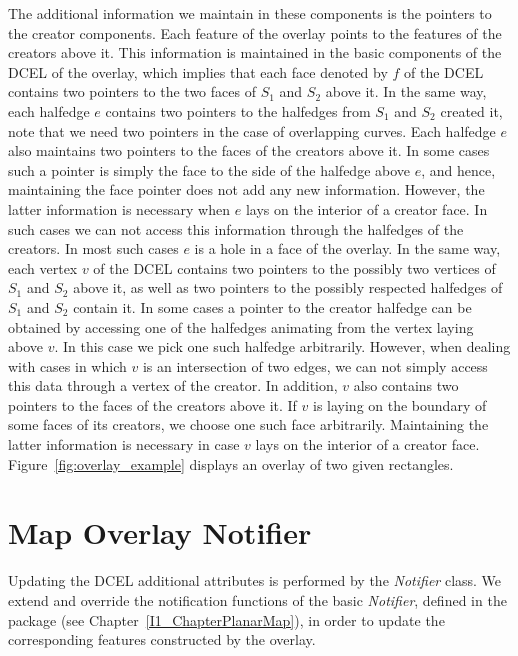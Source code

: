 \begin{ccTexOnly}
The additional information we maintain in these components is the pointers 
to the creator components.
Each feature of the overlay points to the features of the creators above it.
This information is maintained in the basic components of the DCEL of the overlay, 
which implies that each face denoted by $f$ of the DCEL contains two pointers 
to the two faces of $S_1$ and $S_2$  above it. 
In the same way, each halfedge $e$ contains two pointers to the halfedges 
from $S_1$ and $S_2$ created it, note that we need two pointers in the case 
of overlapping curves. 
Each halfedge $e$ also maintains two pointers to the faces of the creators above it. 
In some cases such a pointer is simply the face to the side of the halfedge 
above $e$, and hence, maintaining the face pointer does not add any new information. 
However, the latter information is necessary when $e$ lays on the interior of a creator face. 
In such cases we can not access this information through the halfedges of the creators. 
In most such cases $e$ is a hole in a face of the overlay.
In the same way, each vertex $v$ of the DCEL contains two pointers to the 
possibly two vertices of $S_1$ and $S_2$ above it, 
as well as two pointers to the possibly respected halfedges of $S_1$ and $S_2$ 
contain it. In some cases a pointer to the creator halfedge can be obtained by 
accessing one of the halfedges animating from the vertex laying above $v$.
In this case we pick one such halfedge arbitrarily.
However, when dealing with cases in which $v$ is an intersection of two edges, 
we can not simply access this data through a vertex of the creator.
In addition, $v$ also contains two pointers to the 
faces of the creators above it. 
If $v$ is laying on the boundary of some faces of its creators, 
we choose one such face arbitrarily.
Maintaining the latter information is necessary 
in case $v$ lays on the interior of a creator face.
Figure~\ref{fig:overlay_example} displays an overlay of two given rectangles.

\section{Map Overlay Notifier}
Updating the DCEL additional attributes is performed by the {\em Notifier} class.
We extend and override the notification functions of the basic {\em Notifier}, defined 
in the  package (see Chapter~\ref{I1_ChapterPlanarMap}), 
in order to update the corresponding features constructed by the overlay. 


\end{ccTexOnly}
